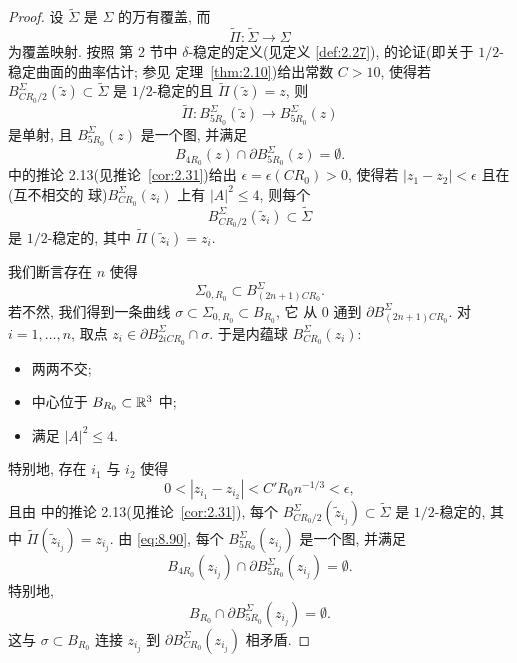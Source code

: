 \begin{proof}
设 $\tilde\Sigma$ 是 $\Sigma$ 的万有覆盖, 而
\begin{equation}
\tilde\Pi:\tilde\Sigma\to\Sigma
\label{eq:8.88}
\end{equation}
为覆盖映射. 按照 \cite{CM4} 第 2 节中 $\delta$-稳定的定义(见定义
\ref{def:2.27}), \cite{CM2} 的论证(即关于 $1/2$-稳定曲面的曲率估计; 参见
定理~\ref{thm:2.10})给出常数 $C>10$, 使得若
$B_{CR_0/2}^\Sigma(\tilde z)\subset\tilde\Sigma$ 是 $1/2$-稳定的且
$\tilde\Pi(\tilde z)=z$, 则
\begin{equation}
\tilde\Pi:B_{5R_0}^\Sigma(\tilde z)\to B_{5R_0}^\Sigma(z)
\label{eq:8.89}
\end{equation}
是单射, 且 $B_{5R_0}^\Sigma(z)$ 是一个图, 并满足
\begin{equation}
B_{4R_0}(z)\cap\partial B_{5R_0}^\Sigma(z)=\emptyset.
\label{eq:8.90}
\end{equation}
\cite{CM4} 中的推论 2.13(见推论~\ref{cor:2.31})给出
$\epsilon=\epsilon(CR_0)>0$, 使得若 $|z_1-z_2|<\epsilon$ 且在(互不相交的
球)$B_{CR_0}^\Sigma(z_i)$ 上有 $|A|^2\leq4$, 则每个
\begin{equation}
B_{CR_0/2}^\Sigma(\tilde z_i)\subset\tilde\Sigma
\label{eq:8.91}
\end{equation}
是 $1/2$-稳定的, 其中 $\tilde\Pi(\tilde z_i)=z_i$.

我们断言存在 $n$ 使得
\begin{equation}
\Sigma_{0,R_0}\subset B_{(2n+1)CR_0}^\Sigma.
\label{eq:8.92}
\end{equation}
若不然, 我们得到一条曲线 $\sigma\subset\Sigma_{0,R_0}\subset B_{R_0}$, 它
从 $0$ 通到 $\partial B_{(2n+1)CR_0}^\Sigma$. 对 $i=1,\ldots,n$, 取点
$z_i\in\partial B_{2iCR_0}^\Sigma\cap\sigma$. 于是内蕴球
$B_{CR_0}^\Sigma(z_i)$:

\begin{itemize}
\item 两两不交;
\item 中心位于 $B_{R_0}\subset\mathbb{R}^3$ 中;
\item 满足 $|A|^2\leq4$.
\end{itemize}
特别地, 存在 $i_1$ 与 $i_2$ 使得
\begin{equation}
0<|z_{i_1}-z_{i_2}|<C' R_0n^{-1/3}<\epsilon,
\label{eq:8.93}
\end{equation}
且由 \cite{CM4} 中的推论 2.13(见推论~\ref{cor:2.31}), 每个
$B_{CR_0/2}^\Sigma(\tilde z_{i_j})\subset\tilde\Sigma$ 是 $1/2$-稳定的, 其中
$\tilde\Pi(\tilde z_{i_j})=z_{i_j}$. 由 \eqref{eq:8.90}, 每个
$B_{5R_0}^\Sigma(z_{i_j})$ 是一个图, 并满足
\begin{equation}
B_{4R_0}(z_{i_j})\cap\partial B_{5R_0}^\Sigma(z_{i_j})=\emptyset.
\label{eq:8.94}
\end{equation}
特别地,
\begin{equation}
B_{R_0}\cap\partial B_{5R_0}^\Sigma(z_{i_j})=\emptyset.
\label{eq:8.95}
\end{equation}
这与 $\sigma\subset B_{R_0}$ 连接 $z_{i_j}$ 到 $\partial B_{CR_0}^\Sigma(z_{i_j})$
相矛盾.
\end{proof}


